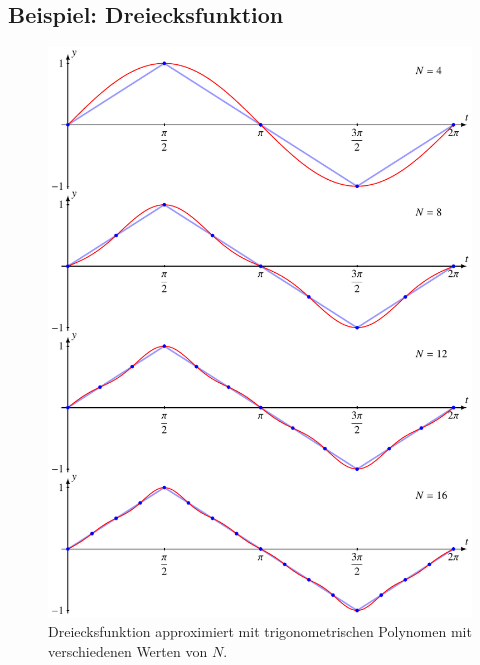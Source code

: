 \subsection{Beispiel: Dreiecksfunktion}
\begin{figure}
\centering
\includegraphics{chapters/6/dreieck.pdf}
\caption{Dreiecksfunktion approximiert mit trigonometrischen Polynomen 
mit verschiedenen Werten von $N$.
\label{skript:fourier:beispiel}}
\end{figure}
